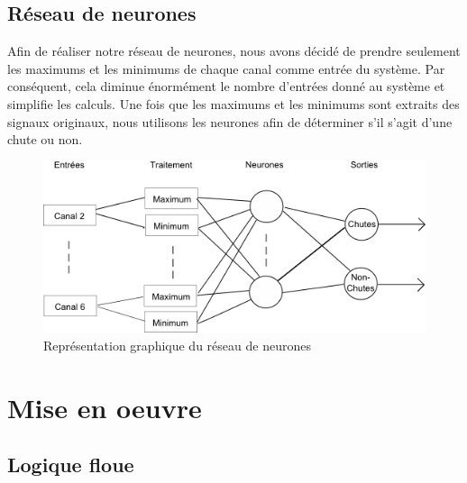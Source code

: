 \documentclass[12pt,letterpaper]{article}
\begin{document}
\subsection{Réseau de neurones} %

Afin de réaliser notre réseau de neurones, nous avons décidé de prendre seulement les maximums et les minimums de chaque canal comme entrée du système. Par conséquent, cela diminue énormément le nombre d'entrées donné au système et simplifie les calculs. Une fois que les maximums et les minimums sont extraits des signaux originaux, nous utilisons les neurones afin de déterminer s'il s'agit d'une chute ou non.

\begin{figure}
\centering
\includegraphics[scale=1]{images/NN.png}
\caption{Représentation graphique du réseau de neurones}
\label{fig:NN}
\end{figure}

\section{Mise en oeuvre}

\subsection{Logique floue}
\end{document}

